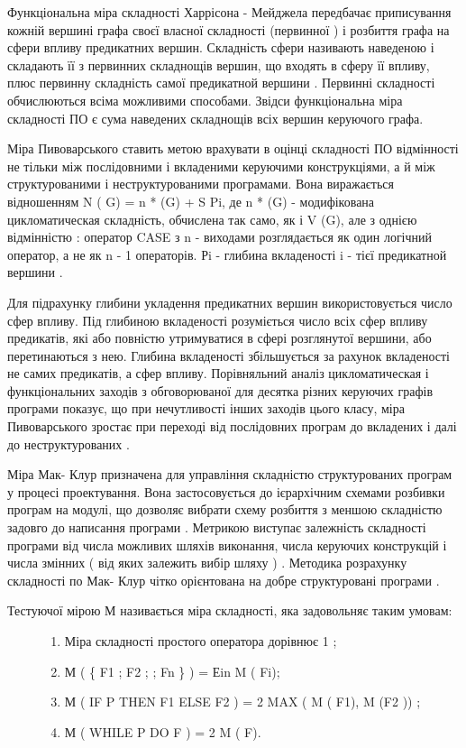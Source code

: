 Функціональна міра складності Харрісона - Мейджела передбачає приписування кожній вершині графа своєї власної складності (первинної ) і розбиття графа на сфери впливу предикатних вершин. Складність сфери називають наведеною і складають її з первинних складнощів вершин, що входять в сферу її впливу, плюс первинну складність самої предикатной вершини . Первинні складності обчислюються всіма можливими способами. Звідси функціональна міра складності ПО є сума наведених складнощів всіх вершин керуючого графа.

Міра Пивоварського ставить метою врахувати в оцінці складності ПО відмінності не тільки між послідовними і вкладеними керуючими конструкціями, а й між структурованими і неструктурованими програмами. Вона виражається відношенням N ( G) = n * (G) + S Pi, де n * (G) - модифікована цикломатическая складність, обчислена так само, як і V (G), але з однією відмінністю : оператор CASE з n - виходами розглядається як один логічний оператор, а не як n - 1 операторів. Рi - глибина вкладеності i - тієї предикатной вершини .

Для підрахунку глибини укладення предикатних вершин використовується число сфер впливу. Під глибиною вкладеності розуміється число всіх сфер впливу предикатів, які або повністю утримуватися в сфері розглянутої вершини, або перетинаються з нею. Глибина вкладеності збільшується за рахунок вкладеності не самих предикатів, а сфер впливу. Порівняльний аналіз цикломатическая і функціональних заходів з обговорюваної для десятка різних керуючих графів програми показує, що при нечутливості інших заходів цього класу, міра Пивоварського зростає при переході від послідовних програм до вкладених і далі до неструктурованих .

Міра Мак- Клур призначена для управління складністю структурованих програм у процесі проектування. Вона застосовується до ієрархічним схемами розбивки програм на модулі, що дозволяє вибрати схему розбиття з меншою складністю задовго до написання програми . Метрикою виступає залежність складності програми від числа можливих шляхів виконання, числа керуючих конструкцій і числа змінних ( від яких залежить вибір шляху ) . Методика розрахунку складності по Мак- Клур чітко орієнтована на добре структуровані програми .
\begin{description}
\item[{Тестуючої мірою М називається міра складності, яка задовольняє таким умовам:}] \leavevmode\begin{enumerate}
\item {} 
Міра складності простого оператора дорівнює 1 ;

\item {} 
М ( \{ F1 ; F2 ;  ; Fn \} ) = Еin M ( Fi);

\item {} 
М ( IF P THEN F1 ELSE F2 ) = 2 MAX ( M ( F1), M (F2 )) ;

\item {} 
М ( WHILE P DO F ) = 2 M ( F).

\end{enumerate}

\end{description}

